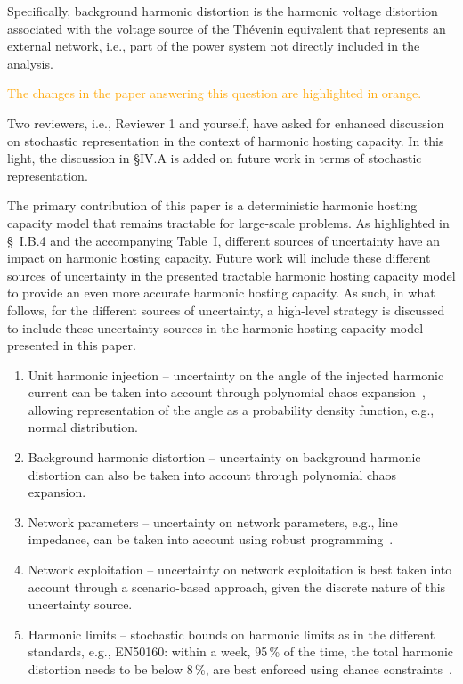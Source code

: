 \documentclass[10pt]{article}
\begin{document}
\begin{tcolorbox}[colback=black!5!white,colframe=black]

Specifically, background harmonic distortion is the harmonic voltage distortion associated with the voltage source of the Thévenin equivalent that represents an external network, i.e., part of the power system not directly included in the analysis. \newline 

\textcolor{orange}{The changes in the paper answering this question are highlighted in orange.} \newline 

Two reviewers, i.e., Reviewer 1 and yourself, have asked for enhanced discussion on  stochastic representation in the context of harmonic hosting capacity. In this light, the discussion in \S IV.A is added on future work in terms of stochastic representation. \newline

The primary contribution of this paper is a deterministic harmonic hosting capacity model that remains tractable for large-scale problems. As highlighted in \S~I.B.4 and the accompanying Table~I, different sources of uncertainty have an impact on harmonic hosting capacity. Future work will include these different sources of uncertainty in the presented tractable harmonic hosting capacity model to provide an even more accurate harmonic hosting capacity. As such, in what follows, for the different sources of uncertainty, a high-level strategy is discussed to include these uncertainty sources in the harmonic hosting capacity model presented in this paper.
\begin{enumerate}
    \item [a)] Unit harmonic injection -- uncertainty on the angle of the injected harmonic current can be taken into account through polynomial chaos expansion~\cite{sullivan_introduction_2015}, allowing representation of the angle as a probability density function, e.g., normal distribution.
    \item [b)] Background harmonic distortion -- uncertainty on background harmonic distortion can also be taken into account through polynomial chaos expansion.
    \item [c)] Network parameters -- uncertainty on network parameters, e.g., line impedance, can be taken into account using robust programming~\cite{nemirovski_2019}.
    \item [d)] Network exploitation -- uncertainty on network exploitation is best taken into account through a scenario-based approach, given the discrete nature of this uncertainty source.
    \item [e)] Harmonic limits -- stochastic bounds on harmonic limits as in the different standards, e.g., EN50160: within a week, 95\,\% of the time, the total harmonic distortion needs to be below 8\,\%, are best enforced using chance constraints~\cite{birge_introduction_2011}.
\end{enumerate}

\end{tcolorbox}
\end{document}
